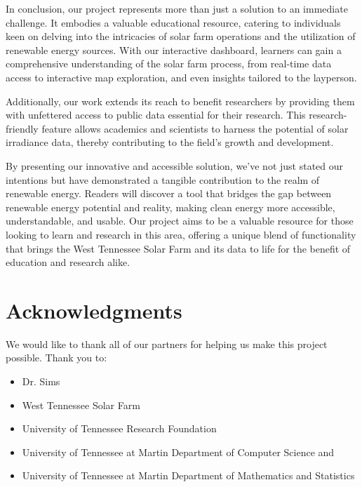 \documentclass{sigchi}
\begin{document}
In conclusion, our project represents more than just a solution to an immediate challenge. It embodies a valuable educational resource, catering to individuals keen on delving into the intricacies of solar farm operations and the utilization of renewable energy sources. With our interactive dashboard, learners can gain a comprehensive understanding of the solar farm process, from real-time data access to interactive map exploration, and even insights tailored to the layperson. 

Additionally, our work extends its reach to benefit researchers by providing them with unfettered access to public data essential for their research. This research-friendly feature allows academics and scientists to harness the potential of solar irradiance data, thereby contributing to the field's growth and development.

By presenting our innovative and accessible solution, we've not just stated our intentions but have demonstrated a tangible contribution to the realm of renewable energy. Readers will discover a tool that bridges the gap between renewable energy potential and reality, making clean energy more accessible, understandable, and usable. Our project aims to be a valuable resource for those looking to learn and research in this area, offering a unique blend of functionality that brings the West Tennessee Solar Farm and its data to life for the benefit of education and research alike.

\section{Acknowledgments}

We would like to thank all of our partners for helping us make this project possible. Thank you to:
\begin{itemize}
    \item Dr. Sims
    \item West Tennessee Solar Farm
    \item University of Tennessee Research Foundation
    \item University of Tennessee at Martin Department of Computer Science and
    \item University of Tennessee at Martin Department of Mathematics and Statistics
\end{itemize}
\balance{}

\balance{}




\end{document}
